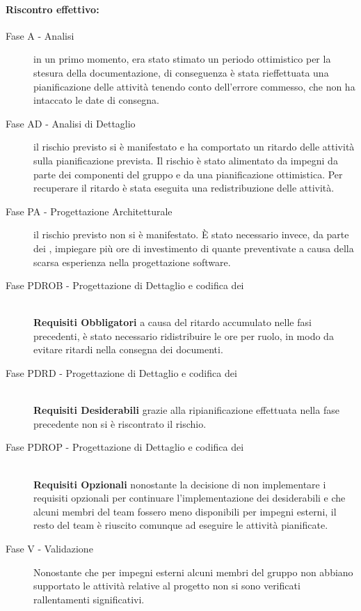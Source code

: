 \documentclass[../PianoProgetto.tex]{subfiles}
\begin{document}
	\paragraph*{Riscontro effettivo:} 
		\begin{description}
			\item[Fase A - Analisi] in un primo momento, era stato stimato un periodo ottimistico per la stesura della documentazione, di conseguenza è stata rieffettuata una pianificazione delle attività tenendo conto dell'errore commesso, che non ha intaccato le date di consegna.
			\item[Fase AD - Analisi di Dettaglio] il rischio previsto si è manifestato e ha comportato un ritardo delle attività sulla pianificazione prevista. Il rischio è stato alimentato da impegni da parte dei componenti del gruppo e da una pianificazione ottimistica. Per recuperare il ritardo è stata eseguita una redistribuzione delle attività.
			\item[Fase PA - Progettazione Architetturale] il rischio previsto non si è manifestato. È stato necessario invece, da parte dei \progettisti, impiegare più ore di investimento di quante preventivate a causa della scarsa esperienza nella progettazione software\g.
			\item[Fase PDROB - Progettazione di Dettaglio e codifica dei]  \ \\
					\textbf{Requisiti Obbligatori} a causa del ritardo accumulato nelle fasi precedenti, è stato necessario ridistribuire le ore per ruolo, in modo da evitare ritardi nella consegna dei documenti.
			\item[Fase PDRD - Progettazione di Dettaglio e codifica dei] \ \\
					\textbf{Requisiti Desiderabili} grazie alla ripianificazione effettuata nella fase precedente non si è riscontrato il rischio.
			\item[Fase PDROP - Progettazione di Dettaglio e codifica dei]  \ \\
					\textbf{Requisiti Opzionali} nonostante la decisione di non implementare i requisiti opzionali per continuare l'implementazione dei desiderabili e che alcuni membri del team fossero meno disponibili per impegni esterni, il resto del team è riuscito comunque ad eseguire le attività pianificate.
			\item[Fase V - Validazione] Nonostante che per impegni esterni alcuni membri del gruppo 		non abbiano supportato le attività relative al progetto non si sono verificati 			rallentamenti significativi.
		\end{description}
		
\end{document}
